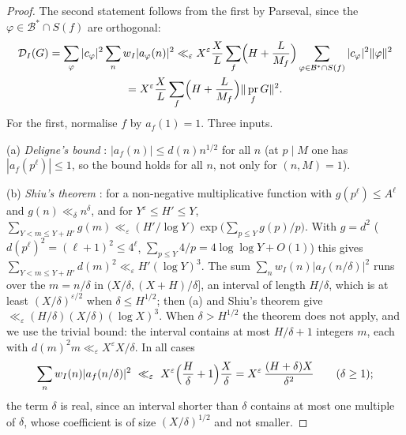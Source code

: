 \documentclass[11pt]{amsart}
\theoremstyle{remark}
\newcommand{\cB}{\mathcal{B}}
\newcommand{\e}{\varepsilon}
\DeclareMathOperator{\pr}{pr}
\begin{document}
\begin{proof}
The second statement follows from the first by Parseval, since the $\varphi\in\cB^*\cap S(f)$ are orthogonal:
\begin{multline*}
\mathcal D_I(G)=\sum_\varphi|c_\varphi|^2\sum_nw_I|a_\varphi(n)|^2\ll_\e X^\e\frac XL\sum_f\Bigl(H+\frac L{M_f}\Bigr)\sum_{\varphi\in\cB^*\cap S(f)}|c_\varphi|^2\|\varphi\|^2\\
=X^\e\frac XL\sum_f\Bigl(H+\frac L{M_f}\Bigr)\|\pr_fG\|^2 .
\end{multline*}
For the first, normalise $f$ by $a_f(1)=1$. Three inputs.

(a) \emph{Deligne's bound} \cite{Deligne}: $|a_f(n)|\le d(n)n^{1/2}$ for all $n$ (at $p\mid M$ one has $|a_f(p^\ell)|\le1$, so the bound holds for all $n$, not only for $(n,M)=1$).

(b) \emph{Shiu's theorem} \cite[Theorem~1]{Shiu}: for a non-negative multiplicative function with $g(p^\ell)\le A^\ell$ and $g(n)\ll_\delta n^\delta$, and for $Y^{\e}\le H'\le Y$, $\sum_{Y<m\le Y+H'}g(m)\ll_{\e}(H'/\log Y)\exp\bigl(\sum_{p\le Y}g(p)/p\bigr)$. With $g=d^2$ ($d(p^\ell)^2=(\ell+1)^2\le4^\ell$, $\sum_{p\le Y}4/p=4\log\log Y+O(1)$) this gives $\sum_{Y<m\le Y+H'}d(m)^2\ll_\e H'(\log Y)^3$. The sum $\sum_nw_I(n)|a_f(n/\delta)|^2$ runs over the $m=n/\delta$ in $(X/\delta,(X+H)/\delta]$, an interval of length $H/\delta$, which is at least $(X/\delta)^{\e/2}$ when $\delta\le H^{1/2}$; then (a) and Shiu's theorem give $\ll_\e(H/\delta)(X/\delta)(\log X)^3$. When $\delta>H^{1/2}$ the theorem does not apply, and we use the trivial bound: the interval contains at most $H/\delta+1$ integers $m$, each with $d(m)^2m\ll_\e X^{\e}X/\delta$. In all cases
\[
\sum_nw_I(n)|a_f(n/\delta)|^2\ \ll_\e\ X^{\e}\Bigl(\frac H\delta+1\Bigr)\frac X\delta=X^{\e}\,\frac{(H+\delta)X}{\delta^2}\qquad(\delta\ge1);
\]
the term $\delta$ is real, since an interval shorter than $\delta$ contains at most one multiple of $\delta$, whose coefficient is of size $(X/\delta)^{1/2}$ and not smaller.


\end{proof}
\end{document}
